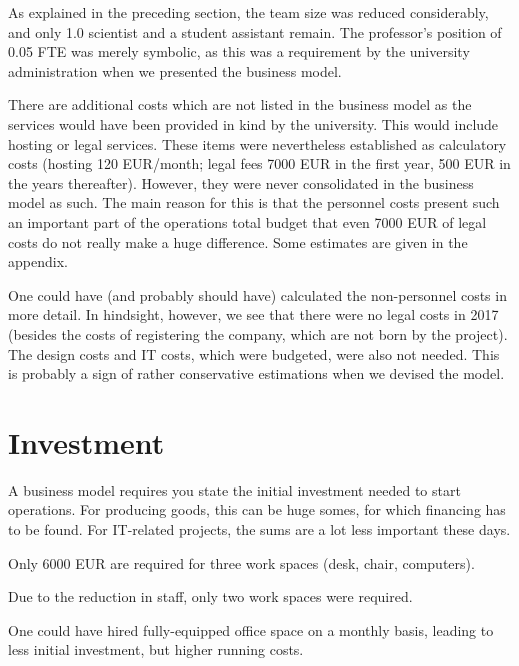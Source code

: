 \documentclass[nonflat,smallfont
]{langsci/langscibook}
\newcommand{\background}[1]{ 
  \vspace{5mm}
  \renewcommand{\tblslinecolour}{lsDarkBlue}
  \tblssy[red]{explore2}{Background}{\vspace*{-5mm}#1}
}
\newcommand{\langscisolution}[1]{
  \renewcommand{\tblslinecolour}{lsLightBlue}
  \tblssy{langsci}{LangSci solution}{\vspace*{-5mm}#1}
}
\newcommand{\evaluation}[1]{
  \renewcommand{\tblslinecolour}{lsLightOrange}
  \tblssy{receipt}{Evaluation}{\vspace*{-5mm}#1}
}
\newcommand{\othersolutions}[1]{
  \renewcommand{\tblslinecolour}{lsDarkGreenOne}
  \tblssy{more}{Other solutions}{\vspace*{-5mm}#1}
}
\renewcommand{\tblssy}[4][black!12]{%
  \renewcommand{\langscisymbol}{#2}\renewcommand{\tblsboxcolor}{#1}
  \begin{mdframed}[style=yellowexercise,frametitle={#3}]
    #4
  \end{mdframed}
}
\begin{document}
\evaluation{As explained in the preceding section, the team size was reduced considerably, and only 1.0 scientist and a student assistant remain. The professor's position of 0.05 FTE was merely symbolic, as this was a requirement by the university administration when we presented the business model. 

There are additional costs which are not listed in the business model as the services would have been provided in kind by the university. This would include hosting or legal services. These items were nevertheless established as calculatory costs (hosting 120 EUR\slash month; legal fees 7000 EUR in the first year, 500 EUR in the years thereafter). However, they were never consolidated in the business model as such. The main reason for this is that the personnel costs present such an important part of the operations total budget that even 7000 EUR of legal costs do not really make a huge difference. Some estimates are given in the appendix.\todo[inline]{Which part?} 
}
\othersolutions{
One could have (and probably should have) calculated the non-personnel costs in more detail.  In hindsight, however, we see that there were no legal costs in 2017 (besides the costs of registering the company, which are not born by the project). The design costs and IT costs, which were budgeted, were also not needed.  This is probably a sign of rather conservative estimations when we devised the model. 
}
  

\section{Investment}
\vspace*{5mm}
\background{A business model requires you state the initial investment needed to start operations. For producing goods, this can be huge somes, for which financing has to be found. For IT-related projects, the sums are a lot less important these days.}
\langscisolution{
Only 6000 EUR are required for three work spaces (desk, chair, computers). 
}
\evaluation{Due to the reduction in staff, only two work spaces were required.}
\othersolutions{
One could have hired fully-equipped office space on a monthly basis, leading to less initial investment, but higher running costs. 
}
 

% 
%  
% 
% 
%  
\end{document}
